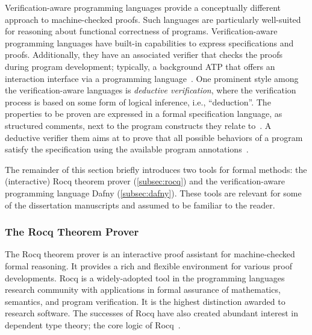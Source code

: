 Verification-aware programming languages provide a conceptually different approach to machine-checked proofs.
Such languages are particularly well-suited for reasoning about functional correctness of programs.
Verification-aware programming languages have built-in capabilities to express specifications and proofs.
Additionally, they have an associated verifier that checks the proofs during program development;
typically, a background ATP that offers an interaction interface via a programming language~\cite{leino2023}.
One prominent style among the verification-aware languages is \emph{deductive verification},
where the verification process is based on some form of logical inference, i.e., \enquote{deduction}.
The properties to be proven are expressed in a formal specification language, as structured comments, next to the program constructs they relate to~\cite{hahnle2019}.
A deductive verifier them aims at to prove that all possible behaviors of a program satisfy the specification using the available program annotations~\cite{cassez2022}.

The remainder of this section briefly introduces two tools for formal methods:
the (interactive) Rocq theorem prover (\autoref{subsec:rocq}) and the verification-aware programming language Dafny (\autoref{subsec:dafny}).
These tools are relevant for some of the dissertation manuscripts and assumed to be familiar to the reader.

\subsubsection{The Rocq Theorem Prover}
\label{subsec:rocq}

The Rocq theorem prover is an interactive proof assistant for machine-checked formal reasoning.
It provides a rich and flexible environment for various proof developments.
Rocq is a widely-adopted tool in the programming languages research community with applications in formal assurance of mathematics, semantics, and program verification.
It is the highest distinction awarded to research software.
The successes of Rocq have also created abundant interest in dependent type theory;
the core logic of Rocq~\cite{coquand1988}.


